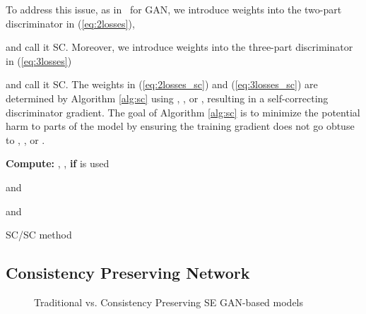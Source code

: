 \documentclass{article}
\begin{document}
To address this issue, as in~\cite{Zadorozhnyy_2021_CVPR} for GAN, we introduce weights into the two-part discriminator in (\ref{eq:2losses}),

and call it SC. Moreover, we
introduce weights into the three-part discriminator in (\ref{eq:3losses})

and call it SC. The weights in (\ref{eq:2losses_sc}) and (\ref{eq:3losses_sc}) are determined by Algorithm \ref{alg:sc} using , , or , resulting in a self-correcting discriminator gradient. The goal of Algorithm \ref{alg:sc} is to minimize the potential harm to parts of the model by ensuring the training gradient  does not go obtuse to , , or .

\vspace{-0.1in}
\IncMargin{0.0em}
\begin{algorithm}
    \scriptsize
    \SetAlgoLined
        \textbf{Compute:} , ,  \textbf{if}  is used 

        \eIf{}
        {
         and 
        
            {
            
            }{

            }
        }{
         and 

            {
            
            }{
\resizebox{1.05\hsize}{!}{
            }
            }
        }
    \caption{SC/SC method}\label{alg:sc}
\end{algorithm}



\subsection{Consistency Preserving Network}\label{ss:cpgen}

\begin{figure*}[ht!]
    \centering
    \hfill
    \label{fig:cpn_total}
    \caption{Traditional vs. Consistency Preserving SE GAN-based models}
\end{figure*}
\end{document}
